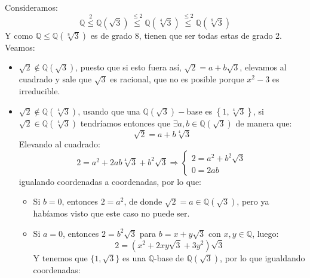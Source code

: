 \begin{ejemplo}
    \noindent
    Consideramos:
    \begin{equation*}
        \mathbb{Q}\stackrel{2}{\leq } \mathbb{Q}\left(\sqrt{3}\right) \stackrel{\leq 2}{\leq} \mathbb{Q}\left(\sqrt[4]{3}\right) \stackrel{\leq 2}{\leq} \mathbb{Q}\left(\sqrt[8]{3}\right)
    \end{equation*}
    Y como $\mathbb{Q}\leq \mathbb{Q}\left(\sqrt[8]{3}\right)$ es de grado 8, tienen que ser todas estas de grado 2. Veamos:
    \begin{itemize}
        \item $\sqrt{2}\notin \mathbb{Q}\left(\sqrt{3}\right)$, puesto que si esto fuera así, $\sqrt{2} = a + b\sqrt{3}$, elevamos al cuadrado y sale que $\sqrt{3}$ es racional, que no es posible porque $x^2-3$ es irreducible.
        \item $\sqrt{2}\notin \mathbb{Q}\left(\sqrt[4]{3}\right)$, usando que una $\mathbb{Q}\left(\sqrt{3}\right)-$base es $\left\{1,\sqrt[4]{3}\right\}$, si $\sqrt{2}\in \mathbb{Q}\left(\sqrt[4]{3}\right)$ tendríamos entonces que $\exists a,b\in \mathbb{Q}\left(\sqrt{3}\right)$ de manera que:
            \begin{equation*}
                \sqrt{2} = a+b\sqrt[4]{3}
            \end{equation*}
            Elevando al cuadrado:
            \begin{equation*}
                2 = a^2 + 2ab\sqrt[4]{3} + b^2\sqrt{3} \Longrightarrow \left\{\begin{array}{l}
                    2 = a^2 + b^2 \sqrt{3} \\
                    0 = 2ab
                \end{array}\right.
            \end{equation*}
            igualando coordenadas a coordenadas, por lo que:
            \begin{itemize}
                \item Si $b= 0$, entonces $2 = a^2$, de donde $\sqrt{2} = a \in \mathbb{Q}(\sqrt{3})$, pero ya habíamos visto que este caso no puede ser.
                \item Si $a = 0$, entonces $2=b^2 \sqrt{3}$ para $b = x+y\sqrt{3}$ con $x,y\in \mathbb{Q}$, luego:
                    \begin{equation*}
                        2 = (x^2 + 2xy\sqrt{3} + 3y^2)\sqrt{3}
                    \end{equation*}
                    Y tenemos que $\{1,\sqrt{3}\}$ es una $\mathbb{Q}$-base de $\mathbb{Q}\left(\sqrt{3}\right)$, por lo que igualdando coordenadas:

\end{itemize}
\end{itemize}
\end{ejemplo}
